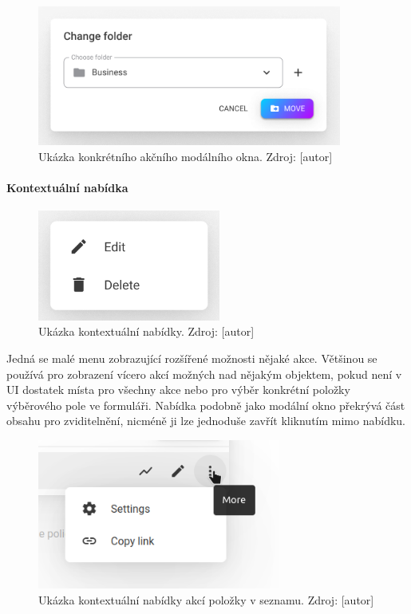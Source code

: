 			\begin{figure}[H]
				\centering
				\includegraphics[width=10cm]{obrazky/modalni_okno_akcni_ukazka}\hfill
				\caption{Ukázka konkrétního akčního modálního okna. Zdroj: [autor]}
			\end{figure}

			\paragraph{Kontextuální nabídka}

			\begin{figure}[H]
				\centering
				\includegraphics[width=6cm]{obrazky/kontextualni_nabidka}\hfill
				\caption{Ukázka kontextuální nabídky. Zdroj: [autor]}
			\end{figure}

			Jedná se malé menu zobrazující rozšířené možnosti nějaké akce.
			Většinou se používá pro zobrazení vícero akcí možných nad nějakým objektem, pokud není v \ac{UI} dostatek
			místa pro všechny akce nebo pro výběr konkrétní položky výběrového pole ve formuláři.
			Nabídka podobně jako modální okno překrývá část obsahu pro zviditelnění, nicméně ji lze jednoduše zavřít
			kliknutím mimo nabídku.

			\begin{figure}[H]
				\centering
				\includegraphics[width=8cm]{obrazky/kontextualni_nabidka_seznam_ukazka}\hfill
				\caption{Ukázka kontextuální nabídky akcí položky v seznamu. Zdroj: [autor]}
			\end{figure}


